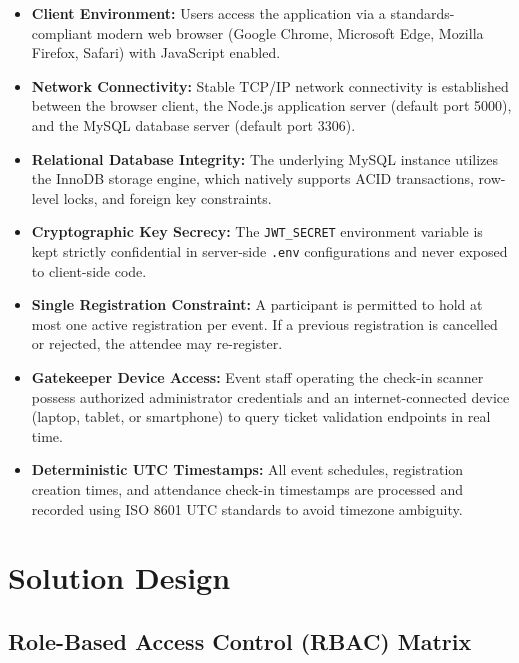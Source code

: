 \documentclass[11pt,a4paper]{article}
\begin{document}
\begin{itemize}[leftmargin=*]
    \item \textbf{Client Environment:} Users access the application via a standards-compliant modern web browser (Google Chrome, Microsoft Edge, Mozilla Firefox, Safari) with JavaScript enabled.
    \item \textbf{Network Connectivity:} Stable TCP/IP network connectivity is established between the browser client, the Node.js application server (default port 5000), and the MySQL database server (default port 3306).
    \item \textbf{Relational Database Integrity:} The underlying MySQL instance utilizes the InnoDB storage engine, which natively supports ACID transactions, row-level locks, and foreign key constraints.
    \item \textbf{Cryptographic Key Secrecy:} The \texttt{JWT\_SECRET} environment variable is kept strictly confidential in server-side \texttt{.env} configurations and never exposed to client-side code.
    \item \textbf{Single Registration Constraint:} A participant is permitted to hold at most one active registration per event. If a previous registration is cancelled or rejected, the attendee may re-register.
    \item \textbf{Gatekeeper Device Access:} Event staff operating the check-in scanner possess authorized administrator credentials and an internet-connected device (laptop, tablet, or smartphone) to query ticket validation endpoints in real time.
    \item \textbf{Deterministic UTC Timestamps:} All event schedules, registration creation times, and attendance check-in timestamps are processed and recorded using ISO 8601 UTC standards to avoid timezone ambiguity.
\end{itemize}

\newpage
\section*{{\color{TitleBlue}\bfseries
\fontsize{18}{22}\selectfont Solution Design}}

\subsection*{Role-Based Access Control (RBAC) Matrix}
\begingroup
\fontsize{9.5}{12}\selectfont
\renewcommand{\arraystretch}{1.35}
\setlength{\tabcolsep}{5pt}
\end{document}

